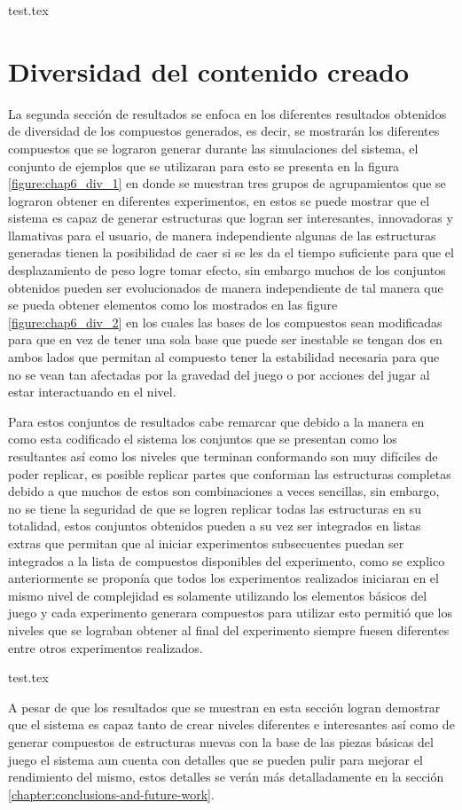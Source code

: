{test.tex}

\newpage

\section{Diversidad del contenido creado}
\label{section:chap6_diversity_results}

La segunda sección de resultados se enfoca en los diferentes resultados
obtenidos de diversidad de los compuestos generados, es decir, se mostrarán los
diferentes compuestos que se lograron generar durante las simulaciones del
sistema, el conjunto de ejemplos que se utilizaran para esto se presenta en la
figura \ref{figure:chap6_div_1} en donde se muestran tres grupos de
agrupamientos que se lograron obtener en diferentes experimentos, en estos se
puede mostrar que el sistema es capaz de generar estructuras que logran ser
interesantes, innovadoras y llamativas para el usuario, de manera independiente
algunas de las estructuras generadas tienen la posibilidad de caer si se les da
el tiempo suficiente para que el desplazamiento de peso logre tomar efecto, sin
embargo muchos de los conjuntos obtenidos pueden ser evolucionados de manera
independiente de tal manera que se pueda obtener elementos como los mostrados en
las figure \ref{figure:chap6_div_2} en los cuales las bases de los compuestos
sean modificadas para que en vez de tener una sola base que puede ser inestable
se tengan dos en ambos lados que permitan al compuesto tener la estabilidad
necesaria para que no se vean tan afectadas por la gravedad del juego o por
acciones del jugar al estar interactuando en el nivel.

Para estos conjuntos de resultados cabe remarcar que debido a la manera en como
esta codificado el sistema los conjuntos que se presentan como los resultantes
así como los niveles que terminan conformando son muy difíciles de poder
replicar, es posible replicar partes que conforman las estructuras completas
debido a que muchos de estos son combinaciones a veces sencillas, sin embargo, no
se tiene la seguridad de que se logren replicar todas las estructuras en su
totalidad, estos conjuntos obtenidos pueden a su vez ser integrados en listas
extras que permitan que al iniciar experimentos subsecuentes puedan ser
integrados a la lista de compuestos disponibles del experimento, como se explico
anteriormente se proponía que todos los experimentos realizados iniciaran en el
mismo nivel de complejidad es solamente utilizando los elementos básicos del
juego y cada experimento generara compuestos para utilizar esto permitió que los
niveles que se lograban obtener al final del experimento siempre fuesen
diferentes entre otros experimentos realizados.

{test.tex}

A pesar de que los resultados que se muestran en esta sección logran demostrar
que el sistema es capaz tanto de crear niveles diferentes e interesantes así
como de generar compuestos de estructuras nuevas con la base de las piezas
básicas del juego el sistema aun cuenta con detalles que se pueden pulir para
mejorar el rendimiento del mismo, estos detalles se verán más detalladamente en
la sección \ref{chapter:conclusions-and-future-work}.
